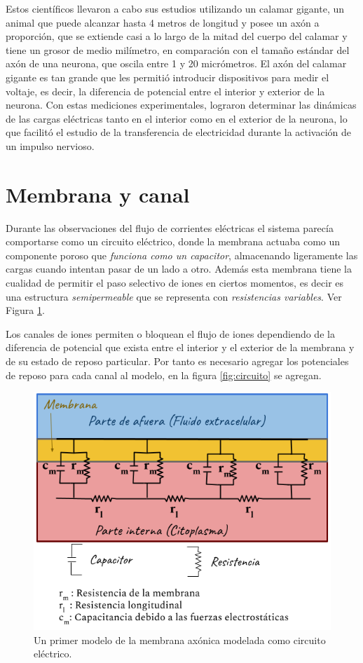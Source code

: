 Estos científicos llevaron a cabo sus estudios utilizando un calamar gigante, un animal que puede alcanzar hasta 4 metros de longitud y posee un axón a proporción, que se extiende casi a lo largo de la mitad del cuerpo del calamar y tiene un grosor de medio milímetro, en comparación con el tamaño estándar del axón de una neurona, que oscila entre 1 y 20 micrómetros. 
El axón del calamar gigante es tan grande que les permitió introducir dispositivos para medir el voltaje, es decir, la diferencia de potencial entre el interior y exterior de la neurona. Con estas mediciones experimentales, lograron determinar las dinámicas de las cargas eléctricas tanto en el interior como en el exterior de la neurona, lo que facilitó el estudio de la transferencia de electricidad durante la activación de un impulso nervioso.
 

\section{Membrana y canal}

Durante las observaciones del flujo de corrientes eléctricas el sistema parecía comportarse como un circuito eléctrico, donde la membrana actuaba como un componente poroso que \textit{funciona como un capacitor}, almacenando ligeramente las cargas cuando intentan pasar de un lado a otro. Además esta membrana tiene la cualidad de permitir el paso selectivo de iones en ciertos momentos, es decir es una estructura \textit{semipermeable} que se representa con \textit{resistencias variables}. Ver Figura \ref{fig:ModelHh}.

Los canales de iones permiten o bloquean el flujo de iones dependiendo de la diferencia de potencial que exista entre el interior y el exterior de la membrana y de su estado de reposo particular. Por tanto es necesario agregar los potenciales de reposo para cada canal al modelo, en la figura \ref{fig:circuito} se agregan.


\begin{figure}[h]
 \centering
 \includegraphics[scale=0.5]{../Figuras/ModeloHH.2}
 \caption{Un primer modelo de la membrana axónica modelada como circuito eléctrico.}
 \label{fig:ModelHh}
\end{figure}



